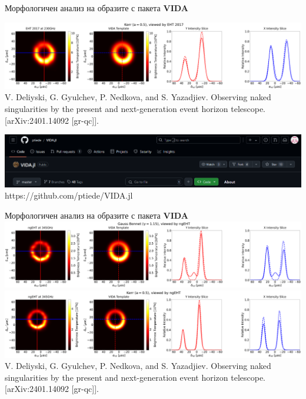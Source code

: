 \documentclass[hyperref={colorlinks,citecolor=blue,linkcolor=blue,urlcolor=blue}]{beamer}
\begin{document}
	\begin{frame}{Морфологичен анализ на образите с пакета \textbf{VIDA}}
		
		\centering
		\includegraphics[scale = 0.11]{Pre-Defence/Ehtim_Vida_plot_2017_230_Kerr.png}\\
		\tiny V. Deliyski, G. Gyulchev, P. Nedkova, and S. Yazadjiev. Observing naked singularities
		by the present and next-generation event horizon telescope. [arXiv:2401.14092 [gr-qc]].\newline
	
		\includegraphics[scale = 0.35]{Pre-Defence/VIDA_github.png}
		\tiny https://github.com/ptiede/VIDA.jl

	\end{frame}
	
	\begin{frame}{Морфологичен анализ на образите с пакета \textbf{VIDA}}
		\includegraphics[scale = 0.11]{Pre-Defence/Ehtim_Vida_plot_ngEHT_345.png}\\
		\includegraphics[scale = 0.11]{Pre-Defence/Ehtim_Vida_plot_ngEHT_345_kerr.png}\newline
		\tiny V. Deliyski, G. Gyulchev, P. Nedkova, and S. Yazadjiev. Observing naked singularities by the present and next-generation event horizon telescope. [arXiv:2401.14092 [gr-qc]].\\

	\end{frame}
	
\end{document}
